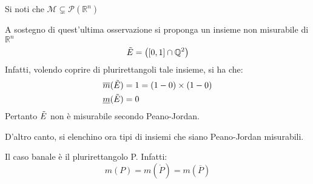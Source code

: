\begin{oss}
    Si noti che $\mathcal{M} \subsetneq \mathcal{P}(\mathbb{R}^n)$
\end{oss}
\begin{example}
    A sostegno di quest'ultima osservazione si proponga un insieme non misurabile di $\mathbb{R}^n$
    \begin{equation*}
        \Tilde{E}=\left( \left[0,1\right] \cap \mathbb{Q}^2\right)
    \end{equation*}
    Infatti, volendo coprire di plurirettangoli tale insieme, si ha che:
    \begin{align*}
        &\overline{m}(\Tilde{E})=1=(1-0)\times(1-0)\\
        &\underline{m}(\Tilde{E})=0
    \end{align*}
    Pertanto $\Tilde{E}$ non è misurabile secondo Peano-Jordan.
\end{example}
D'altro canto, si elenchino ora tipi di insiemi che siano Peano-Jordan misurabili.
\begin{example}
    Il caso banale è il plurirettangolo P. Infatti:
    \begin{equation*}
    m(P)=m(\mathring{P})=m(\overline{P})       
    \end{equation*}
\end{example}

